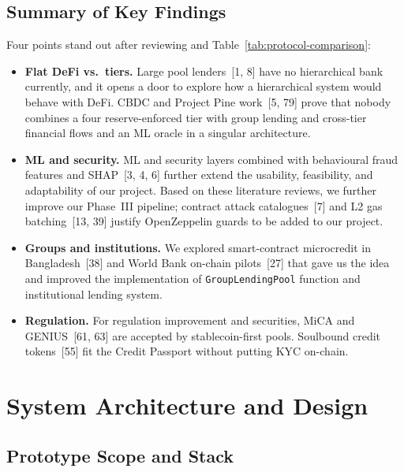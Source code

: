 \documentclass[12pt, a4paper]{report}
\begin{document}
\section{Summary of Key Findings}
\label{sec:lit-key-findings}

Four points stand out after reviewing and Table~\ref{tab:protocol-comparison}:

\begin{itemize}[noitemsep]
\item \textbf{Flat DeFi vs.\ tiers.} Large pool lenders~[1, 8] have no hierarchical bank currently, and it opens a door to explore how a hierarchical system would behave with DeFi. CBDC and Project Pine work~[5, 79] prove that nobody combines a four reserve-enforced tier with group lending and cross-tier financial flows and an ML oracle in a singular architecture.
\item \textbf{ML and security.} ML and security layers combined with behavioural fraud features and SHAP~[3, 4, 6] further extend the usability, feasibility, and adaptability of our project. Based on these literature reviews, we further improve our Phase~III pipeline; contract attack catalogues~[7] and L2 gas batching~[13, 39] justify OpenZeppelin guards to be added to our project.
\item \textbf{Groups and institutions.} We explored smart-contract microcredit in Bangladesh~[38] and World Bank on-chain pilots~[27] that gave us the idea and improved the implementation of \texttt{GroupLendingPool} function and institutional lending system.
\item \textbf{Regulation.} For regulation improvement and securities, MiCA and GENIUS~[61, 63] are accepted by stablecoin-first pools. Soulbound credit tokens~[55] fit the Credit Passport without putting KYC on-chain.
\end{itemize}

\chapter{System Architecture and Design}
\label{ch:architecture-compressed}

\section{Prototype Scope and Stack}
\label{sec:prototype-scope}
\end{document}
